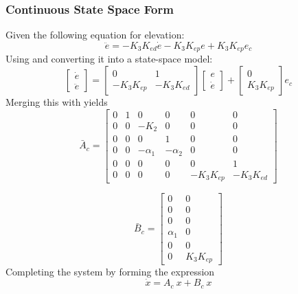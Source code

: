 \subsubsection{Continuous State Space Form}
Given the following equation for elevation:
\begin{equation}\label{eq:elevation}
\ddot{e} = -K_3K_{ed}\dot{e} - K_3K_{ep}e +K_3K_{ep}e_c
\end{equation}
Using  and converting it into a state-space model:
$$
\begin{bmatrix}
\dot{e} \\
\ddot{e}
\end{bmatrix} = \begin{bmatrix}
0 & 1 \\
-K_3K_{ep} & -K_3K_{ed}
\end{bmatrix}\begin{bmatrix}
e \\
\dot{e}
\end{bmatrix}
+\begin{bmatrix}
0 \\
K_3K_{ep}
\end{bmatrix}e_c
$$
Merging this with  yields
\begin{equation}
\bar{A}_c =
\begin{bmatrix}
    0 & 1 & 0 & 0 & 0 & 0 \\
    0 & 0 & -K_2 & 0 & 0 & 0 \\
    0 & 0 & 0 & 1 & 0 & 0 \\
    0 & 0 & -\alpha_1 & - \alpha_2 & 0 & 0 \\
    0 & 0 & 0 & 0 & 0 & 1 \\
    0 & 0 & 0 & 0 & -K_3K_{ep} & -K_3K_{ed}
\end{bmatrix}
\end{equation}

\begin{equation}
\bar{B}_c =
\begin{bmatrix}
    0 & 0\\
    0 & 0 \\
    0 & 0 \\
    \alpha_1 & 0 \\
    0 & 0 \\
    0 & K_3K_{ep}
\end{bmatrix}
\end{equation}
Completing the system by forming the expression
\begin{equation}
\dot{x} = A_c\ x + B_c\ x
\end{equation}

